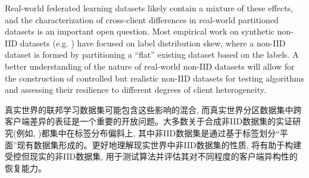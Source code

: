 
Real-world federated learning datasets likely contain a mixture of these effects, and the characterization of cross-client differences in real-world partitioned datasets is an important open question. Most empirical work on synthetic non-IID datasets (e.g. \citep{mcmahan17fedavg, hsieh2019noniid}) have focused on label distribution skew, where a non-IID dataset is formed by partitioning a ``flat'' existing dataset based on the labels. A better understanding of the nature of real-world non-IID datasets will allow for the construction of controlled but realistic non-IID datasets for testing algorithms and assessing their resilience to different degrees of client heterogeneity.

真实世界的联邦学习数据集可能包含这些影响的混合, 而真实世界分区数据集中跨客户端差异的表征是一个重要的开放问题。大多数关于合成非IID数据集的实证研究(例如, \citep{mcmahan17fedavg, hsieh2019noniid})都集中在标签分布偏斜上, 其中非IID数据集是通过基于标签划分“平面”现有数据集形成的。更好地理解现实世界中非IID数据集的性质, 将有助于构建受控但现实的非IID数据集, 用于测试算法并评估其对不同程度的客户端异构性的恢复能力。


